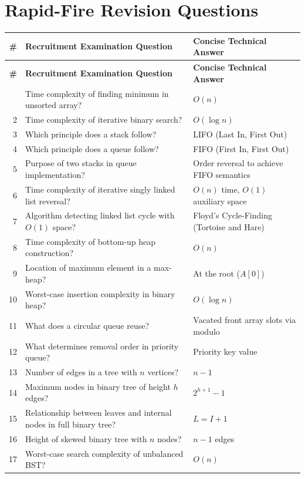 \section{Rapid-Fire Revision Questions}

\begin{longtable}{r p{9.8cm} p{6.8cm}}
\toprule
\textbf{\#} & \textbf{Recruitment Examination Question} & \textbf{Concise Technical Answer} \\
\midrule
\endfirsthead
\toprule
\textbf{\#} & \textbf{Recruitment Examination Question} & \textbf{Concise Technical Answer} \\
\midrule
\endhead
\bottomrule
\endfoot
\bottomrule
\endlastfoot
1  & Time complexity of finding minimum in unsorted array? & $O(n)$ \\
2  & Time complexity of iterative binary search? & $O(\log n)$ \\
3  & Which principle does a stack follow? & LIFO (Last In, First Out) \\
4  & Which principle does a queue follow? & FIFO (First In, First Out) \\
5  & Purpose of two stacks in queue implementation? & Order reversal to achieve FIFO semantics \\
6  & Time complexity of iterative singly linked list reversal? & $O(n)$ time, $O(1)$ auxiliary space \\
7  & Algorithm detecting linked list cycle with $O(1)$ space? & Floyd's Cycle-Finding (Tortoise and Hare) \\
8  & Time complexity of bottom-up heap construction? & $O(n)$ \\
9  & Location of maximum element in a max-heap? & At the root ($A[0]$) \\
10 & Worst-case insertion complexity in binary heap? & $O(\log n)$ \\
11 & What does a circular queue reuse? & Vacated front array slots via modulo \\
12 & What determines removal order in priority queue? & Priority key value \\
13 & Number of edges in a tree with $n$ vertices? & $n - 1$ \\
14 & Maximum nodes in binary tree of height $h$ edges? & $2^{h+1} - 1$ \\
15 & Relationship between leaves and internal nodes in full binary tree? & $L = I + 1$ \\
16 & Height of skewed binary tree with $n$ nodes? & $n - 1$ edges \\
17 & Worst-case search complexity of unbalanced BST? & $O(n)$ \\

\end{longtable}
